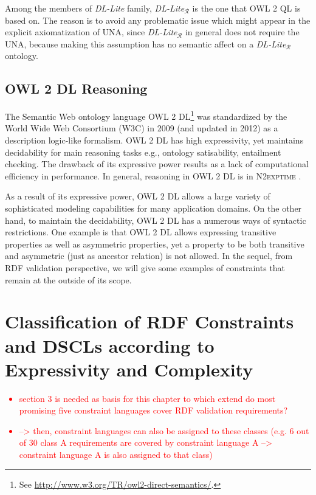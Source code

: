 \documentclass{llncs}
\newcommand{\tb}[1]{\todo[size=\small, color=green!40]{\textbf{Thomas:} #1}}
\begin{document}
Among the members of \textit{DL-Lite} family, \textit{DL-Lite}$_\mathcal{R}$ is the one that OWL 2 QL is based on. The reason is to avoid any problematic issue which might appear in the explicit axiomatization of UNA, since  \textit{DL-Lite}$_\mathcal{R}$ in general does not require the UNA, because making this assumption has no semantic affect on a \textit{DL-Lite}$_\mathcal{R}$ ontology.

\subsection{OWL 2 DL Reasoning}


The Semantic Web ontology language OWL 2 DL\footnote{See \url{http://www.w3.org/TR/owl2-direct-semantics/}.} was standardized by
the World Wide Web Consortium (W3C) in 2009 (and updated in 2012) as a
description logic-like formalism.  OWL 2 DL has high expressivity, yet maintains  decidability for main reasoning tasks e.g., ontology satisability, 
entailment checking. The drawback of its expressive power results as a lack of computational efficiency in performance. In general, reasoning in OWL 2 DL is in \textsc{N2exptime} \cite{owl2profiles2008}. 

As a result of its expressive power, OWL 2 DL allows a large variety of sophisticated modeling capabilities for many application domains.  On the other hand, to maintain the decidability, OWL 2 DL has a numerous ways of syntactic restrictions. One example is that OWL 2 DL allows  expressing transitive properties as well as asymmetric properties, yet a property to be both transitive and asymmetric (just as ancestor relation) is not allowed. In the sequel, from RDF validation perspective, we will give some examples of constraints that remain at the outside of its scope. 

\section{Classification of RDF Constraints and DSCLs according to Expressivity and Complexity}

\textcolor{red}{
\begin{itemize}
	\item section 3 is needed as basis for this chapter to which extend do most promising five constraint languages cover RDF validation requirements?
	\item --> then, constraint languages can also be assigned to these classes (e.g. 6 out of 30 class A requirements are covered by constraint language A --> constraint language A is also assigned to that class)
\end{itemize}
}
\end{document}
